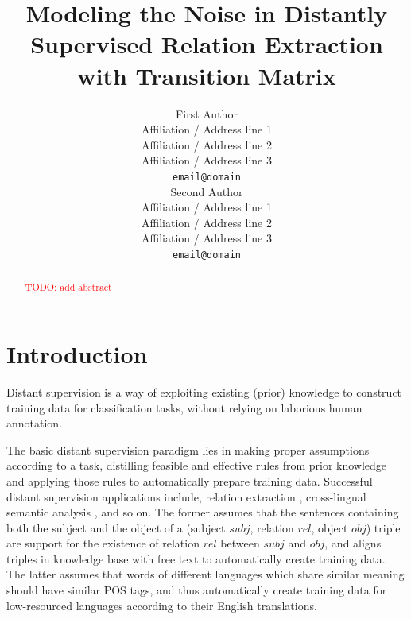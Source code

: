 \documentclass[11pt,a4paper]{article}
\title{Modeling the Noise in Distantly Supervised Relation Extraction with Transition Matrix}
\author{First Author \\
  Affiliation / Address line 1 \\
  Affiliation / Address line 2 \\
  Affiliation / Address line 3 \\
  {\tt email@domain} \\\And
  Second Author \\
  Affiliation / Address line 1 \\
  Affiliation / Address line 2 \\
  Affiliation / Address line 3 \\
  {\tt email@domain} \\}
\date{}
\newcommand{\todo}[1]{\textcolor{red}{TODO: #1}\PackageWarning{TODO:}{#1!}}
\begin{document}
\maketitle
\begin{abstract}
\todo{add abstract}
\end{abstract}

\section{Introduction}



Distant supervision is a way of exploiting existing (prior) knowledge to construct training data for classification tasks, without relying on laborious human annotation. 

The basic distant supervision paradigm lies in making proper assumptions according to a task, distilling feasible and effective rules from prior knowledge and applying those rules to automatically prepare training data. Successful distant supervision applications include, relation extraction \cite{mintz2009distant}, cross-lingual semantic analysis \cite{fang2016learning}, and so on. The former assumes that the sentences containing both the subject and the object of a (subject $subj$, relation $rel$, object $obj$) triple are support for the existence of relation $rel$ between $subj$ and $obj$, and aligns triples in knowledge base with free text to automatically create training data. The latter assumes that words of different languages which share similar meaning should have similar POS tags, and thus automatically create training data for low-resourced languages according to their English translations.

\end{document}
